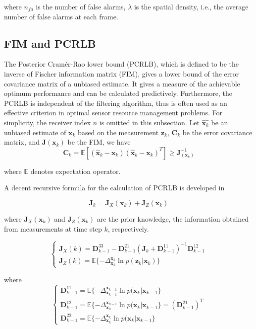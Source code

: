 \documentclass[12pt,journal,draftclsnofoot,onecolumn]{IEEEtran}
\begin{document}
where $n_{fa}$ is the number of false alarms, $\lambda$ is the spatial density, i.e., the average number of false alarms at each frame.

\subsection{FIM and PCRLB}
The Posterior Cramér-Rao lower bound (PCRLB), which is defined to be the inverse of Fischer information matrix (FIM), gives a lower bound of the error covariance matrix of a unbiased estimate. It gives a measure of the achievable optimum performance and can be calculated
predictively. Furthermore, the PCRLB is independent of the filtering algorithm, thus is often used as an effective criterion in optimal sensor resource management problems. For simplicity, the receiver index $n$ is omitted in this subsection. Let $\hat{\mathbf{x}_k}$ be an unbiased estimate of $\mathbf{x}_k$ based on the measurement $\mathbf{z}_k$, $\mathbf{C}_k$ be the error covariance matrix, and $\mathbf{J}(\mathbf{x}_k)$ be the FIM, we have 
\begin{equation}
    \mathbf{C}_k=\mathbb{E}[(\hat{\mathbf{x}}_k-\mathbf{x}_k)(\hat{\mathbf{x}}_k-\mathbf{x}_k)^{T}]\geq \mathbf{J}_(\mathbf{x}_k)^{-1}
\end{equation}

where $\mathbb{E}$ denotes expectation operator.

A decent recursive formula for the calculation of PCRLB is developed in\cite{tichavsky1998posterior}

\begin{equation}
	\mathbf{J}_k=\mathbf{J}_X(\mathbf{x}_k)+\mathbf{J}_Z(\mathbf{x}_k)
	\label{J}
\end{equation}

where $\mathbf{J}_X(\mathbf{x}_k)$ and $\mathbf{J}_Z(\mathbf{x}_k)$ are the prior knowledge, the information obtained from measurements at time step $k$, respectively.

\begin{equation}
	\begin{cases}
		\mathbf{J}_{X}(k)=\mathbf{D}_{k-1}^{33}-\mathbf{D}_{k-1}^{21}(\mathbf{J}_k+\mathbf{D}_{k-1}^{11})^{-1}\mathbf{D}_{k-1}^{12}\\
		\mathbf{J}_Z(k) =\mathbb{E}\{-\Delta _{\mathbf{x}_{k}}^{\mathbf{x}_{k}}\ln p(\mathbf{z}_k|\mathbf{x}_{k})\}
	\end{cases}    
\end{equation}

where
\begin{equation}
	\begin{cases}
		\mathbf{D}_{k-1}^{11}=\mathbb{E}\{-\Delta _{\mathbf{x}_{k-1}}^{\mathbf{x}_{k-1}}\ln p(\mathbf{x}_k|\mathbf{x}_{k-1}\}\\
		\mathbf{D}_{k-1}^{12}=\mathbb{E}\{-\Delta _{\mathbf{x}_{k}}^{\mathbf{x}_{k-1}}\ln p(\mathbf{x}_k|\mathbf{x}_{k-1}\}=(\mathbf{D}_{k-1}^{21})^T\\
		\mathbf{D}_{k-1}^{22}=\mathbb{E}\{-\Delta _{\mathbf{x}_{k}}^{\mathbf{x}_{k}}\ln p(\mathbf{x}_k|\mathbf{x}_{k-1}\}
	\end{cases}   
\end{equation}   
\end{document}
